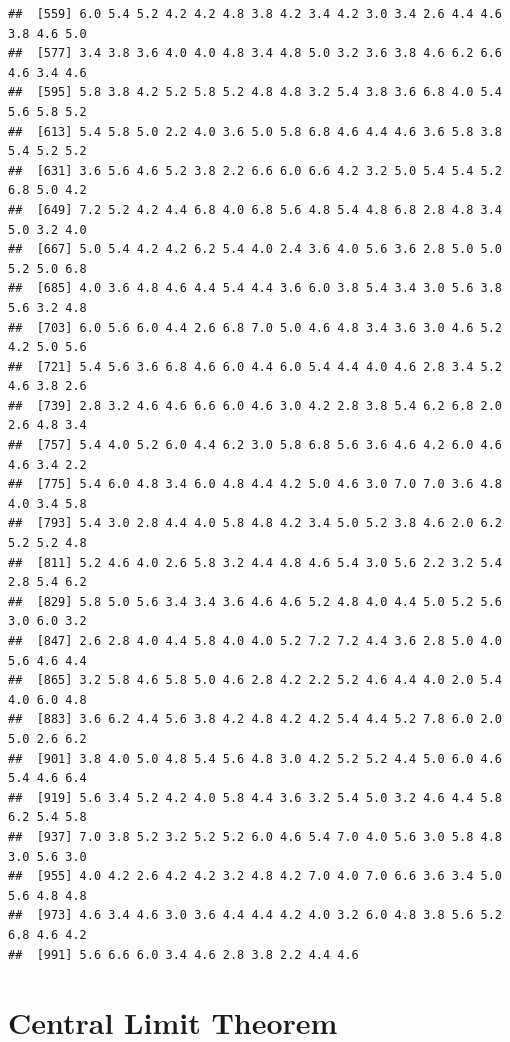 \begin{ExerciseList}
\begin{knitrout}
\begin{kframe}
\begin{verbatim}
##  [559] 6.0 5.4 5.2 4.2 4.2 4.8 3.8 4.2 3.4 4.2 3.0 3.4 2.6 4.4 4.6 3.8 4.6 5.0
##  [577] 3.4 3.8 3.6 4.0 4.0 4.8 3.4 4.8 5.0 3.2 3.6 3.8 4.6 6.2 6.6 4.6 3.4 4.6
##  [595] 5.8 3.8 4.2 5.2 5.8 5.2 4.8 4.8 3.2 5.4 3.8 3.6 6.8 4.0 5.4 5.6 5.8 5.2
##  [613] 5.4 5.8 5.0 2.2 4.0 3.6 5.0 5.8 6.8 4.6 4.4 4.6 3.6 5.8 3.8 5.4 5.2 5.2
##  [631] 3.6 5.6 4.6 5.2 3.8 2.2 6.6 6.0 6.6 4.2 3.2 5.0 5.4 5.4 5.2 6.8 5.0 4.2
##  [649] 7.2 5.2 4.2 4.4 6.8 4.0 6.8 5.6 4.8 5.4 4.8 6.8 2.8 4.8 3.4 5.0 3.2 4.0
##  [667] 5.0 5.4 4.2 4.2 6.2 5.4 4.0 2.4 3.6 4.0 5.6 3.6 2.8 5.0 5.0 5.2 5.0 6.8
##  [685] 4.0 3.6 4.8 4.6 4.4 5.4 4.4 3.6 6.0 3.8 5.4 3.4 3.0 5.6 3.8 5.6 3.2 4.8
##  [703] 6.0 5.6 6.0 4.4 2.6 6.8 7.0 5.0 4.6 4.8 3.4 3.6 3.0 4.6 5.2 4.2 5.0 5.6
##  [721] 5.4 5.6 3.6 6.8 4.6 6.0 4.4 6.0 5.4 4.4 4.0 4.6 2.8 3.4 5.2 4.6 3.8 2.6
##  [739] 2.8 3.2 4.6 4.6 6.6 6.0 4.6 3.0 4.2 2.8 3.8 5.4 6.2 6.8 2.0 2.6 4.8 3.4
##  [757] 5.4 4.0 5.2 6.0 4.4 6.2 3.0 5.8 6.8 5.6 3.6 4.6 4.2 6.0 4.6 4.6 3.4 2.2
##  [775] 5.4 6.0 4.8 3.4 6.0 4.8 4.4 4.2 5.0 4.6 3.0 7.0 7.0 3.6 4.8 4.0 3.4 5.8
##  [793] 5.4 3.0 2.8 4.4 4.0 5.8 4.8 4.2 3.4 5.0 5.2 3.8 4.6 2.0 6.2 5.2 5.2 4.8
##  [811] 5.2 4.6 4.0 2.6 5.8 3.2 4.4 4.8 4.6 5.4 3.0 5.6 2.2 3.2 5.4 2.8 5.4 6.2
##  [829] 5.8 5.0 5.6 3.4 3.4 3.6 4.6 4.6 5.2 4.8 4.0 4.4 5.0 5.2 5.6 3.0 6.0 3.2
##  [847] 2.6 2.8 4.0 4.4 5.8 4.0 4.0 5.2 7.2 7.2 4.4 3.6 2.8 5.0 4.0 5.6 4.6 4.4
##  [865] 3.2 5.8 4.6 5.8 5.0 4.6 2.8 4.2 2.2 5.2 4.6 4.4 4.0 2.0 5.4 4.0 6.0 4.8
##  [883] 3.6 6.2 4.4 5.6 3.8 4.2 4.8 4.2 4.2 5.4 4.4 5.2 7.8 6.0 2.0 5.0 2.6 6.2
##  [901] 3.8 4.0 5.0 4.8 5.4 5.6 4.8 3.0 4.2 5.2 5.2 4.4 5.0 6.0 4.6 5.4 4.6 6.4
##  [919] 5.6 3.4 5.2 4.2 4.0 5.8 4.4 3.6 3.2 5.4 5.0 3.2 4.6 4.4 5.8 6.2 5.4 5.8
##  [937] 7.0 3.8 5.2 3.2 5.2 5.2 6.0 4.6 5.4 7.0 4.0 5.6 3.0 5.8 4.8 3.0 5.6 3.0
##  [955] 4.0 4.2 2.6 4.2 4.2 3.2 4.8 4.2 7.0 4.0 7.0 6.6 3.6 3.4 5.0 5.6 4.8 4.8
##  [973] 4.6 3.4 4.6 3.0 3.6 4.4 4.4 4.2 4.0 3.2 6.0 4.8 3.8 5.6 5.2 6.8 4.6 4.2
##  [991] 5.6 6.6 6.0 3.4 4.6 2.8 3.8 2.2 4.4 4.6
\end{verbatim}
\end{kframe}
\end{knitrout}


\end{ExerciseList}


\section{Central Limit Theorem}

